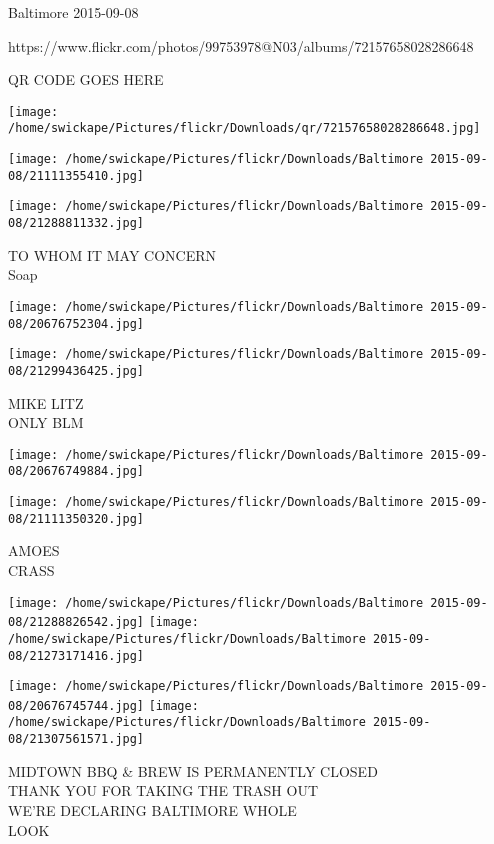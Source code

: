 \documentclass[10pt,letterpaper]{article}
\begin{document}
Baltimore 2015-09-08

https://www.flickr.com/photos/99753978@N03/albums/72157658028286648

QR CODE GOES HERE

\texttt{[image: /home/swickape/Pictures/flickr/Downloads/qr/72157658028286648.jpg]}
\pagebreak

\texttt{[image: /home/swickape/Pictures/flickr/Downloads/Baltimore 2015-09-08/21111355410.jpg]}

\vspace{0.25in}
\texttt{[image: /home/swickape/Pictures/flickr/Downloads/Baltimore 2015-09-08/21288811332.jpg]}

TO WHOM IT MAY CONCERN\\
Soap\\
\pagebreak

\texttt{[image: /home/swickape/Pictures/flickr/Downloads/Baltimore 2015-09-08/20676752304.jpg]}

\vspace{0.25in}
\texttt{[image: /home/swickape/Pictures/flickr/Downloads/Baltimore 2015-09-08/21299436425.jpg]}

MIKE LITZ\\
ONLY BLM\\
\pagebreak

\texttt{[image: /home/swickape/Pictures/flickr/Downloads/Baltimore 2015-09-08/20676749884.jpg]}

\vspace{0.25in}
\texttt{[image: /home/swickape/Pictures/flickr/Downloads/Baltimore 2015-09-08/21111350320.jpg]}

AMOES\\
CRASS\\
\pagebreak

\texttt{[image: /home/swickape/Pictures/flickr/Downloads/Baltimore 2015-09-08/21288826542.jpg]}
\texttt{[image: /home/swickape/Pictures/flickr/Downloads/Baltimore 2015-09-08/21273171416.jpg]}

\texttt{[image: /home/swickape/Pictures/flickr/Downloads/Baltimore 2015-09-08/20676745744.jpg]}
\texttt{[image: /home/swickape/Pictures/flickr/Downloads/Baltimore 2015-09-08/21307561571.jpg]}

MIDTOWN BBQ \& BREW IS PERMANENTLY CLOSED\\
THANK YOU FOR TAKING THE TRASH OUT\\
WE'RE DECLARING BALTIMORE WHOLE\\
LOOK\\
\pagebreak
\end{document}
